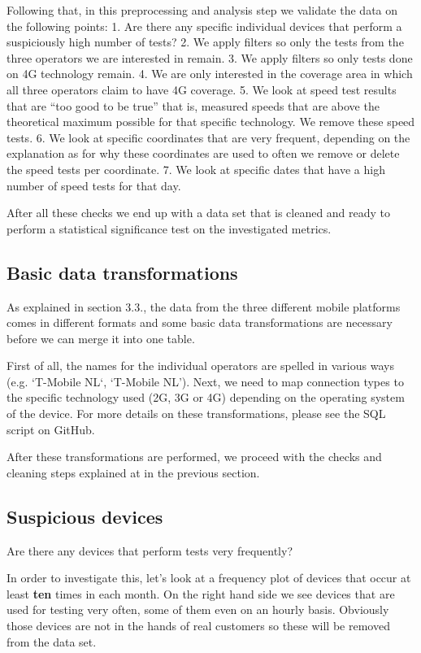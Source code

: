 \documentclass[]{article}
\begin{document}
Following that, in this preprocessing and analysis step we validate the
data on the following points: 1. Are there any specific individual
devices that perform a suspiciously high number of tests? 2. We apply
filters so only the tests from the three operators we are interested in
remain. 3. We apply filters so only tests done on 4G technology remain.
4. We are only interested in the coverage area in which all three
operators claim to have 4G coverage. 5. We look at speed test results
that are ``too good to be true'' that is, measured speeds that are above
the theoretical maximum possible for that specific technology. We remove
these speed tests. 6. We look at specific coordinates that are very
frequent, depending on the explanation as for why these coordinates are
used to often we remove or delete the speed tests per coordinate. 7. We
look at specific dates that have a high number of speed tests for that
day.

After all these checks we end up with a data set that is cleaned and
ready to perform a statistical significance test on the investigated
metrics.

\subsection{Basic data
transformations}\label{basic-data-transformations}

As explained in section 3.3., the data from the three different mobile
platforms comes in different formats and some basic data transformations
are necessary before we can merge it into one table.

First of all, the names for the individual operators are spelled in
various ways (e.g. `T-Mobile NL`, `T-Mobile NL'). Next, we need to map
connection types to the specific technology used (2G, 3G or 4G)
depending on the operating system of the device. For more details on
these transformations, please see the SQL script on GitHub.

After these transformations are performed, we proceed with the checks
and cleaning steps explained at in the previous section.

\subsection{Suspicious devices}\label{suspicious-devices}

Are there any devices that perform tests very frequently?

In order to investigate this, let's look at a frequency plot of devices
that occur at least \textbf{ten} times in each month. On the right hand
side we see devices that are used for testing very often, some of them
even on an hourly basis. Obviously those devices are not in the hands of
real customers so these will be removed from the data set.
\end{document}
